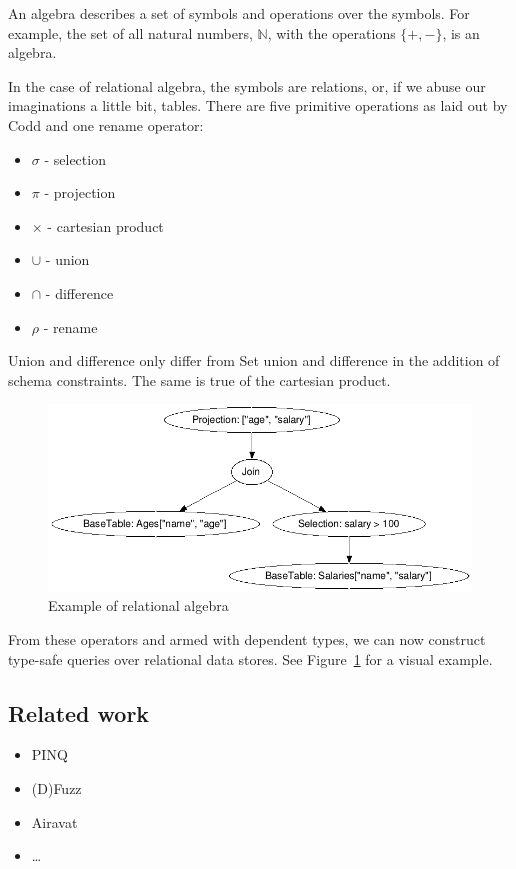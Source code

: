 \documentclass[12pt]{article}
\begin{document}
An algebra describes a set of symbols and operations over the symbols.
For example, the set of all natural numbers, $\mathbb{N}$, with the operations $\{+,-\}$, is an algebra.

In the case of relational algebra, the symbols are relations, or, if we abuse our imaginations a little bit, tables.
There are five primitive operations as laid out by Codd\cite{codd70} and one rename operator:

\begin{itemize}
  \item $\sigma$ - selection
  \item $\pi$    - projection
  \item $\times$ - cartesian product
  \item $\cup$   - union
  \item $\cap$   - difference
  \item $\rho$   - rename
\end{itemize}

Union and difference only differ from Set union and difference in the addition of schema constraints.
The same is true of the cartesian product.

\begin{figure}[tb]
  \centering
  \includegraphics[width=\textwidth]{assets/relalg.jpg}
  \caption{Example of relational algebra}
  \label{fig:example_relalg}
\end{figure}

From these operators and armed with dependent types, we can now construct type-safe queries over relational data stores.
See Figure~\ref{fig:example_relalg} for a visual example.

\subsection{Related work}\label{sec:related_work}

\begin{itemize}
  \item PINQ
  \item (D)Fuzz
  \item Airavat
  \item \ldots
\end{itemize}
\end{document}
